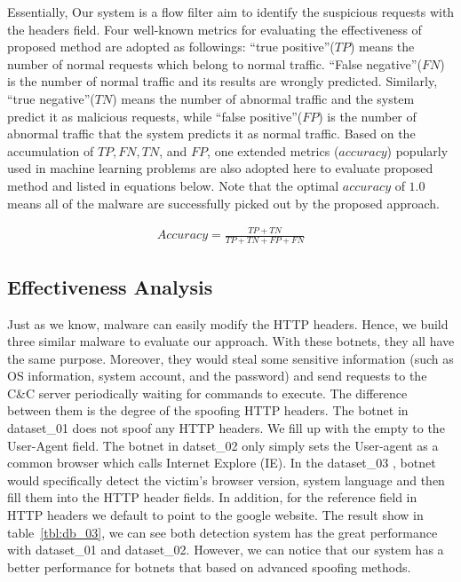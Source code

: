 Essentially, Our system is a flow filter aim to identify the suspicious requests with the headers field. Four well-known metrics for evaluating the effectiveness of proposed method are adopted as followings: ``true positive''($TP$) means the number of normal requests which belong to normal traffic. ``False negative''($FN$) is the number of normal traffic and its results are wrongly predicted. Similarly, ``true negative''($TN$) means the number of abnormal traffic and the system predict it as malicious requests, while ``false positive''($FP$) is the number of abnormal traffic that the system predicts it as normal traffic. Based on the accumulation of $TP, FN, TN$, and $FP$, one extended metrics ($accuracy$) popularly used in machine learning problems are also adopted here to evaluate proposed method and listed in equations below. Note that the optimal $accuracy$ of $1.0$ means all of the malware are successfully picked out by the proposed approach. 


\begin{eqnarray}
\label{eq:accuracy}
Accuracy = \frac{TP+TN}{TP+TN+FP+FN}
\end{eqnarray}

\subsection{Effectiveness Analysis}

Just as we know, malware can easily modify the HTTP headers. Hence, we build three similar malware to evaluate our approach. With these botnets, they all have the same purpose. Moreover, they would steal some sensitive information (such as OS information, system account, and the password) and send requests to the C\&C server periodically waiting for commands to execute. The difference between them is the degree of the spoofing HTTP headers. The botnet in dataset\_01 does not spoof any HTTP headers. We fill up with the empty to the User-Agent field. The botnet in datset\_02 only simply sets the User-agent as a common browser which calls Internet Explore (IE). In the dataset\_03 , botnet would specifically detect the victim's browser version, system language and then fill them into the HTTP header fields. In addition, for the reference field in HTTP headers we default to point to the google website. The result show in table~\ref{tbl:db_03}, we can see both detection system has the great performance with dataset\_01 and dataset\_02. However, we can notice that our system has a better performance for botnets that based on advanced spoofing methods.

